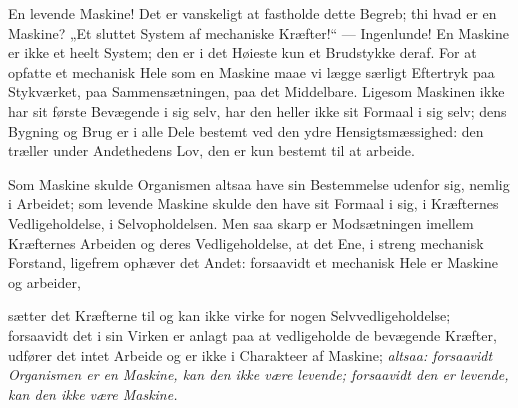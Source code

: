 \documentclass[12pt,a4paper]{book}
\begin{document}
En levende Maskine! Det er vanskeligt at fastholde dette Begreb; thi hvad
er en Maskine? „Et sluttet System af mechaniske Kræfter!“ ---
Ingenlunde! En Maskine er ikke et heelt System; den er i det Høieste kun
et Brudstykke deraf. For at opfatte et mechanisk Hele som en Maskine maae
vi lægge særligt Eftertryk paa Stykværket, paa Sammensætningen, paa det
Middelbare. Ligesom Maskinen ikke har sit første Bevægende i sig selv,
har den heller ikke sit Formaal i sig selv; dens Bygning og Brug er i
alle Dele bestemt ved den ydre Hensigtsmæssighed: den træller under
Andethedens Lov, den er kun bestemt til at arbeide.

Som Maskine skulde Organismen altsaa have sin Bestemmelse udenfor sig,
nemlig i Arbeidet; som levende Maskine skulde den have sit Formaal i sig,
i Kræfternes Vedligeholdelse, i Selvopholdelsen. Men saa skarp er
Modsætningen imellem Kræfternes Arbeiden og deres Vedligeholdelse, at det
Ene, i streng mechanisk Forstand, ligefrem ophæver det Andet: forsaavidt
et mechanisk Hele er Maskine og arbeider,

\setcounter{footnote}{0}
sætter det Kræfterne til og kan ikke virke for nogen Selvvedligeholdelse;
forsaavidt det i sin Virken er anlagt paa at vedligeholde de bevægende
Kræfter, udfører det intet Arbeide og er ikke i Charakteer af Maskine;
\emph{altsaa: forsaavidt Organismen er en Maskine, kan den ikke være
levende; forsaavidt den er levende, kan den ikke være Maskine.}
\end{document}
